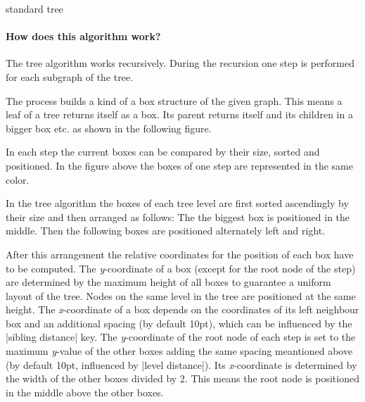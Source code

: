 \begin{gdalgorithm}{standard tree}
\paragraph{How does this algorithm work?}
The tree algorithm works recursively. During the recursion one step is performed for each subgraph of the tree. 

The process builds a kind of a box structure of the given graph. This means a leaf of a tree returns itself as a box. Its parent returns itself and its children in a bigger box etc. as shown in the following figure.

\begin{quote}
\end{quote}

In each step the current boxes can be compared by their size, sorted and positioned. In the figure above the boxes of one step are represented in the same color.

In the tree algorithm the boxes of each tree level are first sorted ascendingly by their size and then arranged as follows: The the biggest box is positioned in the middle. Then the following boxes are positioned alternately left and right.

After this arrangement the relative coordinates for the position of each box have to be computed. The \emph{y}-coordinate of a box (except for the root node of the step) are determined by the maximum height of all boxes to guarantee a uniform layout of the tree. Nodes on the same level in the tree are positioned at the same height. The \emph{x}-coordinate of a box depends on the coordinates of its left neighbour box and an additional spacing (by default 10pt), which can be influenced by the |sibling distance| key. The \emph{y}-coordinate of the root node of each step is set to the maximum \emph{y}-value of the other boxes adding the same spacing meantioned above (by default 10pt, influenced by |level distance|). Its \emph{x}-coordinate is determined by the width of the other boxes divided by 2. This means the root node is positioned in the middle above the other boxes.


\end{gdalgorithm}
